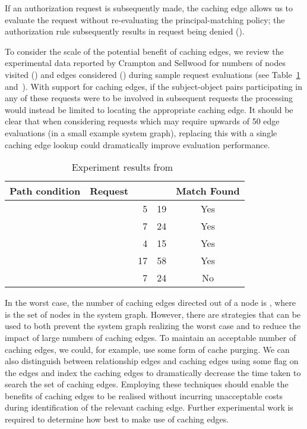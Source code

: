 \documentclass{article}
\begin{document}
If an authorization request  is subsequently made, the caching edge  allows us to evaluate the request without re-evaluating the principal-matching policy; the authorization rule  subsequently results in request  being denied ().

To consider the scale of the potential benefit of caching edges, we review the experimental data reported by Crampton and Sellwood for numbers of nodes visited () and edges considered () during sample request evaluations (see Table~\ref{tbl:implementation_metrics} and~\cite[\S{3.3}]{CramptonS14}).
With support for caching edges, if the subject-object pairs participating in any of these requests were to be involved in subsequent requests the processing would instead be limited to locating the appropriate caching edge.
It should be clear that when considering requests which may require upwards of 50 edge evaluations (in a small example system graph), replacing this with a single caching edge lookup could dramatically improve evaluation performance.

\begin{table}[!ht]\centering
  \caption{Experiment results from~\cite[\S{3.3}]{CramptonS14}}\label{tbl:implementation_metrics}
  {\renewcommand{\arraystretch}{1.25}
\begin{tabular}{|c|c|r|r|c|}
    \hline
        \bf Path condition & \bf Request &  &  & \bf Match Found\\
    \hline
    \hline
         &  & 5 & 19 & Yes\\
         &  & 7 & 24 & Yes\\
          &  & 4 & 15 & Yes\\
         &  & 17 & 58 & Yes\\
         &  & 7 & 24 & No\\
    \hline
  \end{tabular}}
\end{table}

In the worst case, the number of caching edges directed out of a node is , where  is the set of nodes in the system graph.
However, there are strategies that can be used to both prevent the system graph realizing the worst case and to reduce the impact of large numbers of caching edges.
To maintain an acceptable number of caching edges, we could, for example, use some form of cache purging.
We can also distinguish between relationship edges and caching edges using some flag on the edges and index the caching edges to dramatically decrease the time taken to search the set of caching edges.
Employing these techniques should enable the benefits of caching edges to be realised without incurring unacceptable costs during identification of the relevant caching edge.
Further experimental work is required to determine how best to make use of caching edges.
\end{document}

